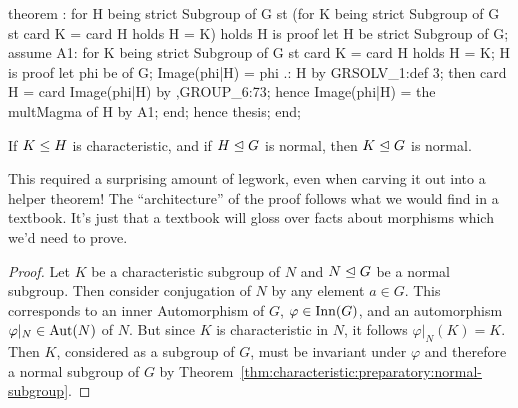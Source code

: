 \nwenddocs{}\endmoddef\nwstartdeflinemarkup{}\nwenddeflinemarkup
theorem :
  for H being strict Subgroup of G
  st (for K being strict Subgroup of G
      st card K = card H
      holds H = K)
  holds H is 
proof
  let H be strict Subgroup of G;
  assume A1: for K being strict Subgroup of G st card K = card H holds H = K;
  H is 
  proof
    let phi be  of G;
    Image(phi|H) = phi .: H by GRSOLV_1:def 3;
    then card H = card Image(phi|H) by ,GROUP_6:73;
    hence Image(phi|H) = the multMagma of H by A1;
  end;
  hence thesis;
end;
\eatline
{}\nwendcode{}\nwdocspar
\begin{theorem}
If $K\leq H$ is characteristic, and if $H\trianglelefteq G$ is normal,
then $K\trianglelefteq G$ is normal.
\end{theorem}

This required a surprising amount of legwork, even when carving it out
into a helper theorem! The ``architecture'' of the proof follows what we
would find in a textbook. It's just that a textbook will gloss over
facts about morphisms which we'd need to prove.

\begin{proof}
Let $K$ be a characteristic subgroup of $N$ and $N\trianglelefteq G$ be
a normal subgroup. Then consider conjugation of $N$ by any element $a\in G$.
This corresponds to an inner Automorphism of $G$, $\varphi\in\operatorname{Inn}(G)$, and an
automorphism $\varphi|_{N}\in\operatorname{Aut}(N)$ of $N$. But since $K$ is
characteristic in $N$, it follows $\varphi|_{N}(K)=K$. Then $K$,
considered as a subgroup of $G$, must be invariant under $\varphi$ and
therefore a normal subgroup of $G$ by Theorem~\ref{thm:characteristic:preparatory:normal-subgroup}.
\end{proof}

